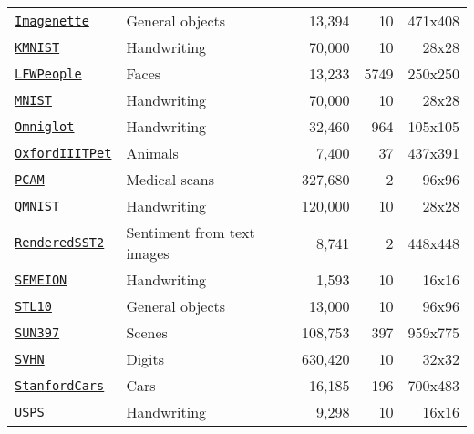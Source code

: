 \begin{table}[htbp]
\begin{tabular}{llrrr}
\href{https://github.com/fastai/imagenette#imagenette-1}{\texttt{Imagenette}} & General objects & 13,394 & 10 & 471x408 \\
\href{https://github.com/rois-codh/kmnist}{\texttt{KMNIST}} & Handwriting & 70,000 & 10 & 28x28 \\
\href{http://vis-www.cs.umass.edu/lfw/}{\texttt{LFWPeople}} & Faces & 13,233 & 5749 & 250x250 \\
\href{http://yann.lecun.com/exdb/mnist/}{\texttt{MNIST}} & Handwriting & 70,000 & 10 & 28x28 \\
\href{https://github.com/brendenlake/omniglot}{\texttt{Omniglot}} & Handwriting & 32,460 & 964 & 105x105 \\
\href{https://www.robots.ox.ac.uk/~vgg/data/pets/}{\texttt{OxfordIIITPet}} & Animals & 7,400 & 37 & 437x391 \\
\href{https://github.com/basveeling/pcam}{\texttt{PCAM}} & Medical scans & 327,680 & 2 & 96x96 \\
\href{https://github.com/facebookresearch/qmnist}{\texttt{QMNIST}} & Handwriting & 120,000 & 10 & 28x28 \\
\href{https://github.com/openai/CLIP/blob/main/data/rendered-sst2.md}{\texttt{RenderedSST2}} & Sentiment from text images & 8,741 & 2 & 448x448 \\
\href{https://archive.ics.uci.edu/dataset/178/semeion+handwritten+digit}{\texttt{SEMEION}} & Handwriting & 1,593 & 10 & 16x16 \\
\href{https://cs.stanford.edu/~acoates/stl10/}{\texttt{STL10}} & General objects & 13,000 & 10 & 96x96 \\
\href{https://vision.princeton.edu/projects/2010/SUN/}{\texttt{SUN397}} & Scenes & 108,753 & 397 & 959x775 \\
\href{http://ufldl.stanford.edu/housenumbers/}{\texttt{SVHN}} & Digits & 630,420 & 10 & 32x32 \\
\href{https://www.kaggle.com/datasets/jessicali9530/stanford-cars-dataset}{\texttt{StanfordCars}} & Cars & 16,185 & 196 & 700x483 \\
\href{https://www.csie.ntu.edu.tw/~cjlin/libsvmtools/datasets/multiclass.html#usps}{\texttt{USPS}} & Handwriting & 9,298 & 10 & 16x16 \\
\bottomrule
\end{tabular}
\end{table}
